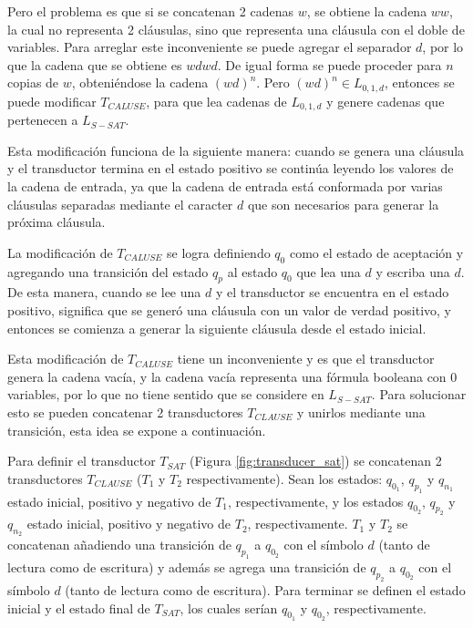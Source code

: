 Pero el problema es que si se concatenan 2 cadenas $w$, se obtiene la cadena $ww$, la cual no representa 2 cláusulas,
sino que representa una cláusula con el doble de variables. Para arreglar este inconveniente se puede agregar el separador
$d$, por lo que la cadena que se obtiene es $wdwd$. De igual forma se puede proceder para $n$ copias de $w$, obteniéndose
la cadena $(wd)^n$. Pero $(wd)^n\in L_{0,1,d}$, entonces se puede modificar $T_{CALUSE}$, para que lea cadenas de $L_{0,1,d}$ y genere cadenas que pertenecen a $L_{S-SAT}$.

Esta modificación funciona de la siguiente manera: 
cuando se genera una cláusula y el transductor termina en el estado positivo se continúa leyendo los valores de la cadena de entrada, ya que la cadena de entrada está conformada por varias cláusulas separadas mediante el caracter $d$ que son necesarios para generar la próxima cláusula.

La modificación de $T_{CALUSE}$ se logra definiendo $q_0$ como el estado de aceptación y agregando una 
transición del estado $q_p$ al estado $q_0$ que lea una $d$ y escriba una $d$. De esta manera, cuando se lee una $d$ y el transductor se encuentra en el estado positivo, significa
que se generó una cláusula con un valor de verdad positivo, y entonces se comienza a generar la siguiente cláusula desde el estado inicial. 

Esta modificación de $T_{CALUSE}$ tiene un inconveniente y es que el transductor genera la cadena vacía, y la cadena vacía representa una fórmula booleana con 0 variables, por lo que no tiene sentido que se considere en $L_{S-SAT}$. Para solucionar esto se pueden concatenar 2 transductores $T_{CLAUSE}$ y unirlos mediante una transición, esta idea se expone a continuación.

Para definir el transductor $T_{SAT}$ (Figura \ref{fig:transducer_sat}) se concatenan 2 transductores $T_{CLAUSE}$ ($T_1$ y $T_2$ respectivamente). Sean los estados: $q_{0_1}$, $q_{p_1}$ y $q_{n_1}$ estado inicial, positivo y negativo de $T_1$, respectivamente, y los estados $q_{0_2}$, $q_{p_2}$ y $q_{n_2}$ estado inicial, positivo y negativo de $T_2$, respectivamente. $T_1$ y $T_2$ se concatenan añadiendo una transición de $q_{p_1}$ a $q_{0_2}$ con el símbolo $d$ (tanto de lectura como de escritura) y además se agrega una transición de $q_{p_2}$ a $q_{0_2}$ con el símbolo $d$ (tanto de lectura como de escritura).  Para terminar se definen el estado inicial y el estado final de $T_{SAT}$, los cuales serían $q_{0_1}$ y $q_{0_2}$, respectivamente.




